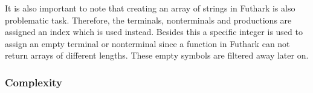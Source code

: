 It is also important to note that creating an array of strings in Futhark is also problematic task. Therefore, the terminals, nonterminals and productions are assigned an index which is used instead. Besides this a specific integer is used to assign an empty terminal or nonterminal since a function in Futhark can not return arrays of different lengths. These empty symbols are filtered away later on.

\subsubsection{Complexity}